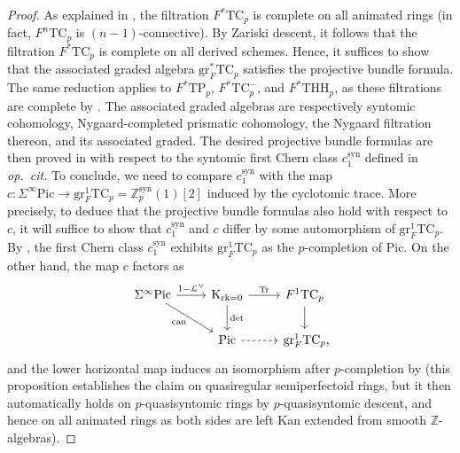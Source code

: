 \documentclass{amsart}
\numberwithin{equation}{section}
\theoremstyle{plain}
\theoremstyle{definition}
\let\scr=\mathcal
\let\bb=\mathbb
\def\Z{\bb Z}
\def\P{\bb P}
\def\Pic{\mathrm{Pic}}
\def\THH{\mathrm{THH}}
\DeclareMathOperator{\rk}{rk}
\def\K{\mathrm{K}{}}
\def\gr{\mathrm{gr}}
\newcommand{\TC}{\mathrm{TC}}
\newcommand{\TP}{\mathrm{TP}}
\newcommand{\syn}{\mathrm{syn}}
\begin{document}
\begin{proof}
As explained in \cite[Construction~5.33]{AMMN}, the filtration $F^*\TC_p$ is complete on all animated rings (in fact, $F^n\TC_p$ is $(n-1)$-connective).
By Zariski descent, it follows that the filtration $F^*\TC_p$ is complete on all derived schemes.
Hence, it suffices to show that the associated graded algebra $\gr^*_F\TC_p$ satisfies the projective bundle formula. 
The same reduction applies to $F^*\TP_p$, $F^*\TC_p^-$, and $F^*\THH_p$, as these filtrations are complete by \cite[Corollary 6.2.15]{BhattLurie}.
The associated graded algebras are respectively syntomic cohomology, Nygaard-completed prismatic cohomology, the Nygaard filtration thereon, and its associated graded. The desired projective bundle formulas are then proved in \cite[Lemma~9.1.4]{BhattLurie} with respect to the syntomic first Chern class $c_1^\syn$ defined in \emph{op.\ cit.} To conclude, we need to compare $c_1^\syn$ with the map $c\colon \Sigma^\infty\Pic\to \gr^1_F\TC_p=\Z_p^\syn(1)[2]$ induced by the cyclotomic trace.
More precisely, to deduce that the projective bundle formulas also hold with respect to $c$, it will suffice to show that $c_1^\syn$ and $c$ differ by some automorphism of $\gr^1_F\TC_p$. By \cite[Theorem~7.5.6]{BhattLurie}, the first Chern class $c_1^\syn$ exhibits $\gr^1_F\TC_p$ as the $p$-completion of $\Pic$.
On the other hand, the map $c$ factors as
\[
\begin{tikzcd}
\Sigma^\infty\Pic \ar{r}{1-\scr L^\vee} \ar{dr}[swap]{\mathrm{can}} &  \K_{\rk=0} \ar{r}{\mathrm{Tr}} \ar{d}{\det} & F^1\TC_p \ar{d} \\
 & \Pic \ar[dashed]{r} & \gr^1_F\TC_p\rlap,
\end{tikzcd}
\]
and the lower horizontal map induces an isomorphism after $p$-completion by \cite[Proposition~7.17]{BMS} (this proposition establishes the claim on quasiregular semiperfectoid rings, but it then automatically holds on $p$-quasisyntomic rings by $p$-quasisyntomic descent, and hence on all animated rings as both sides are left Kan extended from smooth $\Z$-algebras).
\end{proof}
\end{document}
